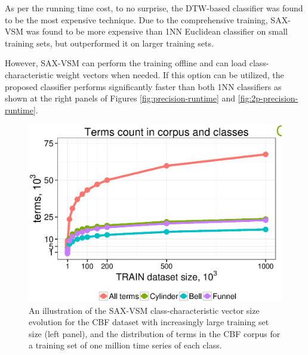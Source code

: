 As per the running time cost, to no surprise, the DTW-based classifier was found to be the most expensive technique. 
Due to the comprehensive training, SAX-VSM was found to be more expensive than 1NN Euclidean 
classifier on small training sets, but outperformed it on larger training sets.

However, SAX-VSM can perform the training offline and can load class-characteristic \tfidf weight vectors when needed. 
If this option can be utilized, the proposed classifier performs significantly faster than both 1NN classifiers as 
shown at the right panels of Figures \ref{fig:precision-runtime} and \ref{fig:2p-precision-runtime}.

\begin{figure}[t]
   \centering
   \includegraphics[width=140mm]{figures/words-cbf.ps}
   \caption[An illustration of the SAX-VSM class-characteristic vector size evolution for the CBF dataset 
   with increasingly large training set size.]{An illustration of the SAX-VSM class-characteristic vector size evolution for the CBF dataset 
   with increasingly large training set size (left panel), and the distribution of terms in the CBF corpus for 
   a training set of one million time series of each class.}
   \label{fig:venn-cbf}


\end{figure}
